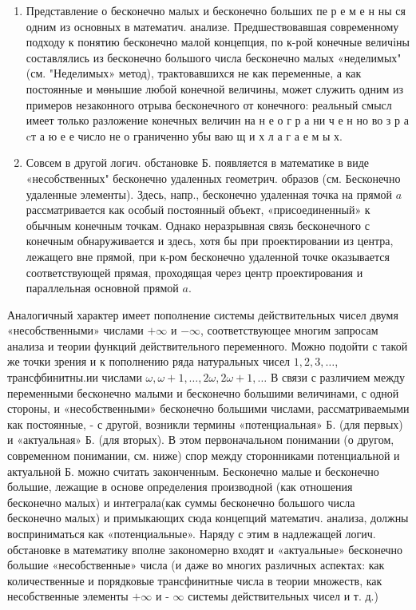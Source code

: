 \documentclass[10pt]{article}
\begin{document}
\begin{enumerate}

  \item Представление о бесконечно малых и бесконечно больших пе р е м е н ны ся одним из основных в математич. анализе. Предшествовавшая современному подходу к понятию бесконечно малой концепция, по к-рой конечные величіны составлялись из бесконечно большого числа бесконечно малых «неделимых" (см. "Неделимых» метод), трактовавшихся не как переменные, а как постоянные и мөнышие любой конечной величины, может служить одним из примеров незаконного отрыва бесконечного от конечного: реальный смысл имеет только разложение конечных величин на н е о г р а ни ч е н но во з р а cт а ю е е число не о граниченно убы ваю щ и х л а г а е м ы х.



  \item Совсем в другой логич. обстановке Б. появляется в математике в виде «несобственных" бесконечно удаленных геометрич. образов (см. Бесконечно удаленные элементы). Здесь, напр., бесконечно удаленная точка на прямой $a$ рассматривается как особый постоянный объект, «присоединенный» к обычным конечным точкам. Однако неразрывная связь бесконечного с конечным обнаруживается и здесь, хотя бы при проектировании из центра, лежащего вне прямой, при к-ром бесконечно удаленной точке оказывается соответствующей прямая, проходящая через центр проектирования и параллельная основной прямой $a$.



\end{enumerate}



Аналогичный характер имеет пополнение системы действительных чисел двумя «несобственными» числами $+\infty$ и $-\infty$, соответствующее многим запросам анализа и теории функций действительного переменного. Можно подойти с такой же точки зрения и к пополнению ряда натуральных чисел $1,2,3, \ldots$, трансфбинитны.ии числами $\omega, \omega+1, \ldots, 2 \omega, 2 \omega+1, \ldots$ В связи с различием между переменными бесконечно малыми и бесконечно большими величинами, с одной стороны, и «несобственными» бесконечно большими числами, рассматриваемыми как постоянные, - с другой, возникли термины «потенциальная» Б. (для первых) и «актуальная» Б. (для вторых). В этом первоначальном понимании (о другом, современном понимании, см. ниже) спор между сторонниками потенциальной и актуальной Б. можно считать законченным. Бесконечно малые и бесконечно большие, лежащие в основе определения производной (как отношения бесконечно малых) и интеграла(как суммы бесконечно большого числа бесконечно малых) и примыкающих сюда концепций математич. анализа, должны восприниматься как «потенциальные». Наряду с этим в надлежащей логич. обстановке в математику вполне закономерно входят и «актуальные» бесконечно большие «несобственные» числа (и даже во многих различных аспектах: как количественные и порядковые трансфинитные числа в теории множеств, как несобственные элементы $+\infty$ и - $\infty$ системы действительных чисел и т. д.)
\end{document}

